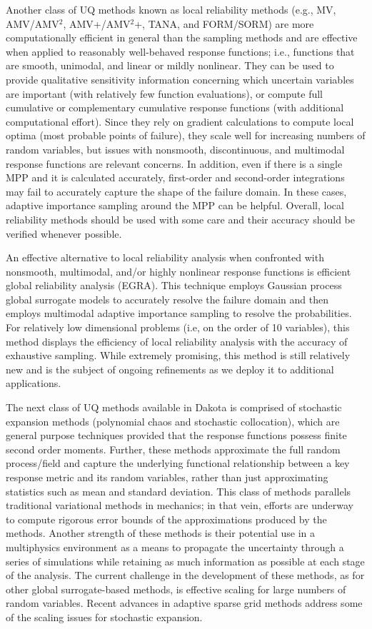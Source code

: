 Another class of UQ methods known as local reliability methods (e.g.,
MV, AMV/AMV$^2$, AMV+/AMV$^2$+, TANA, and FORM/SORM) are more
computationally efficient in general than the sampling methods and are
effective when applied to reasonably well-behaved response functions;
i.e., functions that are smooth, unimodal, and linear or mildly
nonlinear. They can be used to provide qualitative sensitivity
information concerning which uncertain variables are important (with
relatively few function evaluations), or compute full cumulative or
complementary cumulative response functions (with additional
computational effort).  Since they rely on gradient calculations to
compute local optima (most probable points of failure), they scale
well for increasing numbers of random variables, but issues with
nonsmooth, discontinuous, and multimodal response functions are
relevant concerns. In addition, even if there is a single MPP and it
is calculated accurately, first-order and second-order integrations
may fail to accurately capture the shape of the failure domain.  In
these cases, adaptive importance sampling around the MPP can be
helpful.  Overall, local reliability methods should be used with some
care and their accuracy should be verified whenever possible.

An effective alternative to local reliability analysis when confronted
with nonsmooth, multimodal, and/or highly nonlinear response functions
is efficient global reliability analysis (EGRA).  This technique
employs Gaussian process global surrogate models to accurately resolve
the failure domain and then employs multimodal adaptive importance
sampling to resolve the probabilities.  For relatively low dimensional
problems (i.e, on the order of 10 variables), this method displays the
efficiency of local reliability analysis with the accuracy of
exhaustive sampling.  While extremely promising, this method is still
relatively new and is the subject of ongoing refinements as we deploy
it to additional applications.

The next class of UQ methods available in Dakota is comprised of
stochastic expansion methods (polynomial chaos and stochastic
collocation), which are general purpose techniques provided that the
response functions possess finite second order moments. Further, these
methods approximate the full random process/field and capture the
underlying functional relationship between a key response metric and
its random variables, rather than just approximating statistics such
as mean and standard deviation. This class of methods parallels
traditional variational methods in mechanics; in that vein, efforts
are underway to compute rigorous error bounds of the approximations
produced by the methods. Another strength of these methods is their
potential use in a multiphysics environment as a means to propagate
the uncertainty through a series of simulations while retaining as
much information as possible at each stage of the analysis.  The
current challenge in the development of these methods, as for other
global surrogate-based methods, is effective scaling for large numbers
of random variables.  Recent advances in adaptive sparse grid methods 
address some of the scaling issues for stochastic expansion.

